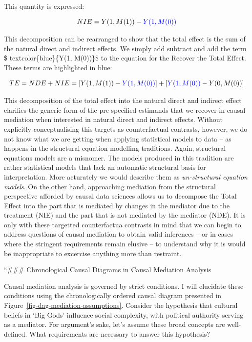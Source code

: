 \documentclass[
  singlecolumn,
  9pt]{article}
\begin{document}
This quantity is expressed:

\[
 NIE = Y(1, M(1)) - \textcolor{blue}{Y(1, M(0))}
 \]

This decomposition can be rearranged to show that the total effect is
the sum of the natural direct and indirect effects. We simply add
subtract and add the term \$ textcolor\{blue\}\{Y(1, M(0))\}\$ to the
equation for the Recover the Total Effect. These terms are highlighted
in blue:

\[
TE = NDE + NIE = [Y(1, M(1)) - \textcolor{blue}{Y(1, M(0))}] + [\textcolor{blue}{Y(1, M(0))} - Y(0, M(0))]
\]

This decomposition of the total effect into the natural direct and
indirect effect clarifies the generic form of the pre-specified
estimands that we recover in causal mediation when interested in natural
direct and indirect effects. Without explicitly conceptualising this
targets as counterfactual contrasts, however, we do not know what we are
getting when applying statistical models to data -- as happens in the
structural equation modelling traditions. Again, structural equations
models are a misnomer. The models produced in this tradition are rather
statistical models that lack an automatic structural basis for
interpretation. More acturately we would describe them as
\emph{un-structural equation models}. On the other hand, approaching
mediation from the structural perspective afforded by causal data
sciences allows us to decompose the Total Effect into the part that is
mediated by changes in the mediator due to the treatment (NIE) and the
part that is not mediated by the mediator (NDE). It is only with these
targetted counterfactua contrasts in mind that we can begin to address
questions of causal mediation to obtain valid inferences -- or in cases
where the stringent requirements remain elusive -- to understand why it
is would be inappropriate to excercise anything more than restraint.

``\#\#\# Chronological Causal Diagrams in Causal Mediation Analysis

Causal mediation analysis is governed by strict conditions. I will
elucidate these conditions using the chronologically ordered causal
diagram presented in Figure~\ref{fig-dag-mediation-assumptions}.
Consider the hypothesis that cultural beliefs in `Big Gods' influence
social complexity, with political authority serving as a mediator. For
argument's sake, let's assume these broad concepts are well-defined.
What requirements are necessary to answer this hypothesis?
\end{document}
